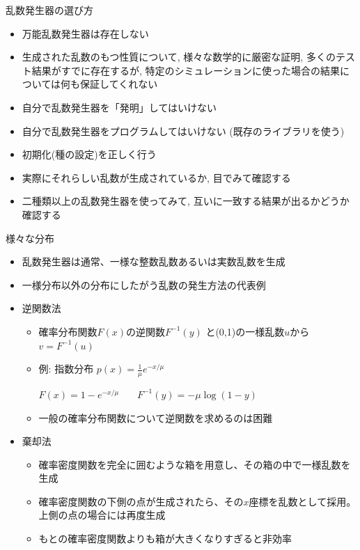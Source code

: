 \begin{frame}[t,fragile]{乱数発生器の選び方}
  \begin{itemize}
  \item 万能乱数発生器は存在しない
  \item 生成された乱数のもつ性質について, 様々な数学的に厳密な証明, 多くのテスト結果がすでに存在するが, 特定のシミュレーションに使った場合の結果については何も保証してくれない
  \item 自分で乱数発生器を「発明」してはいけない
  \item 自分で乱数発生器をプログラムしてはいけない (既存のライブラリを使う)
  \item 初期化(種の設定)を正しく行う
  \item 実際にそれらしい乱数が生成されているか, 目でみて確認する
  \item 二種類以上の乱数発生器を使ってみて, 互いに一致する結果が出るかどうか確認する
  \end{itemize}
\end{frame}

\begin{frame}[t,fragile]{様々な分布}
  \begin{itemize}
  \item 乱数発生器は通常、一様な整数乱数あるいは実数乱数を生成
  \item 一様分布以外の分布にしたがう乱数の発生方法の代表例
  \item 逆関数法
    \begin{itemize}
      \item 確率分布関数$F(x)$の逆関数$F^{-1}(y)$ と(0,1)の一様乱数$u$から $v=F^{-1}(u)$
      \item 例: 指数分布 $p(x) = \frac{1}{\mu} e^{-x/\mu}$

      $F(x) = 1 - e^{-x/\mu}$ \ \ \ $F^{-1}(y) = - \mu \log(1-y)$
      \item 一般の確率分布関数について逆関数を求めるのは困難
    \end{itemize}
  \item 棄却法
    \begin{itemize}
      \item 確率密度関数を完全に囲むような箱を用意し、その箱の中で一様乱数を生成
      \item 確率密度関数の下側の点が生成されたら、その$x$座標を乱数として採用。上側の点の場合には再度生成
      \item もとの確率密度関数よりも箱が大きくなりすぎると非効率
    \end{itemize}
  \end{itemize}
\end{frame}

